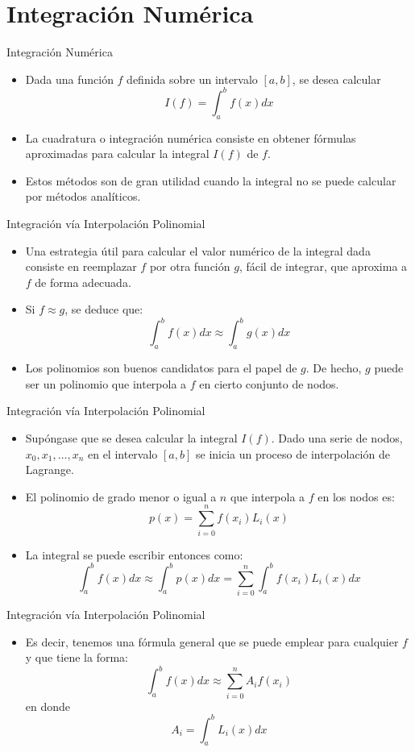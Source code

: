 \documentclass[12pt]{beamer}
\begin{document}
\section{Integraci\'on Num\'erica}
\begin{frame}{Integraci\'on Num\'erica}
    \begin{itemize}
        \item Dada una funci\'on $f$ definida sobre un intervalo $[a,b]$, se desea calcular
        $$
        I(f) = \int_a^bf(x)dx
        $$
        \item<2-> La cuadratura o integraci\'on num\'erica consiste en obtener f\'ormulas aproximadas para calcular la integral $I(f)$ de $f$.
        \item<3->Estos m\'etodos son de gran utilidad cuando la integral no se puede calcular por m\'etodos anal\'iticos.        
    \end{itemize}
\end{frame}
\begin{frame}{Integraci\'on v\'ia Interpolaci\'on Polinomial}
  \begin{itemize}
    \item Una estrategia \'util para calcular el valor num\'erico de la integral dada consiste en reemplazar $f$ por otra funci\'on $g$, f\'acil de integrar, que aproxima a $f$ de forma adecuada.
    \item<2->Si $f \approx g$, se deduce que:
    $$
    \int_a^bf(x)dx \approx \int_a^bg(x)dx
    $$
    \item<3-> Los polinomios son buenos candidatos para el papel de $g$. De hecho, $g$ puede ser un polinomio que interpola a $f$ en cierto conjunto de nodos.    
  \end{itemize}
\end{frame}
\begin{frame}{Integraci\'on v\'ia Interpolaci\'on Polinomial}
  \begin{itemize}
    \item Sup\'ongase que se desea calcular la integral $I(f)$. Dado una serie de nodos, $x_0,x_1,\ldots,x_n$ en el intervalo
    $[a,b]$ se inicia un proceso de interpolaci\'on de Lagrange.
    \item<2-> El polinomio de grado menor o igual a $n$ que interpola a
    $f$ en los nodos es:
    $$
    p(x)=\sum_{i=0}^nf(x_i)L_i(x)
    $$
    \item<3-> La integral se puede escribir entonces como:
    $$
    \int_a^bf(x)dx \approx \int_a^bp(x)dx =   \sum_{i=0}^n\int_a^bf(x_i)L_i(x)dx
    $$    
  \end{itemize}
\end{frame} 
\begin{frame}{Integraci\'on v\'ia Interpolaci\'on Polinomial}
  \begin{itemize}
    \item Es decir, tenemos una f\'ormula general que se puede emplear para cualquier $f$ y que tiene la forma:
    $$
    \int_a^bf(x)dx \approx \sum_{i=0}^nA_if(x_i)
    $$    
    en donde
    $$
    A_i=\int_a^bL_i(x)dx
    $$
    \end{itemize}
\end{frame}
\end{document}
